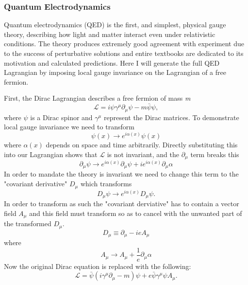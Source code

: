 \subsubsection{Quantum Electrodynamics}
Quantum electrodynamics (QED) is the first, and simplest, physical gauge theory, describing how light and matter interact even under relativistic conditions. The theory produces extremely good agreement with experiment due to the success of perturbative solutions and entire textbooks are dedicated to its motivation and calculated predictions. Here I will generate the full QED Lagrangian by imposing local gauge invariance on the Lagrangian of a free fermion. 

First, the Dirac Lagrangian describes a free fermion of mass \textit{m}
\begin{equation}
\mathcal{L} = i \psi \gamma^\mu \partial_ \mu \psi - m\bar{\psi}\psi,
\end{equation}
where $\psi$ is a Dirac spinor and $\gamma^\mu$ represent the Dirac matrices. To demonstrate local gauge invariance we need to transform
\begin{equation}
\psi(x) \rightarrow e^{i\alpha(x)}\psi(x) 
\end{equation}
where $\alpha(x)$ depends on space and time arbitrarily. Directly substituting this into our Lagrangian shows that $\mathcal{L}$ is not invariant, and the $\partial_\mu$ term breaks this
\begin{equation}
\partial_\mu \psi \rightarrow e^{i\alpha(x)}\partial_\mu\psi + ie^{i\alpha(x)}\partial_\mu \alpha
\end{equation}
In order to mandate the theory is invariant we need to change this term to the "covariant derivative" $D_\mu$ which transforms 
\begin{equation}
D_\mu\psi \rightarrow e^{i\alpha(x)}D_\mu\psi . 
\end{equation}	 
In order to transform as such the "covariant derviative" has to contain a vector field $A_\mu$ and this field must transform so as to cancel with the unwanted part of the transformed $D_\mu$. 
\begin{equation}
D_\mu \equiv \partial_\mu - ieA_\mu
\end{equation}
where 
\begin{equation}
A_\mu \rightarrow A_\mu + \frac{1}{e}\partial_\mu \alpha
\end{equation}
Now the original Dirac equation is replaced with the following:
\begin{equation}
\mathcal{L} = \bar{\psi}(i\gamma^\mu\partial_\mu-m)\psi + e\bar{\psi}\gamma^\mu\psi A_\mu.
\end{equation}
